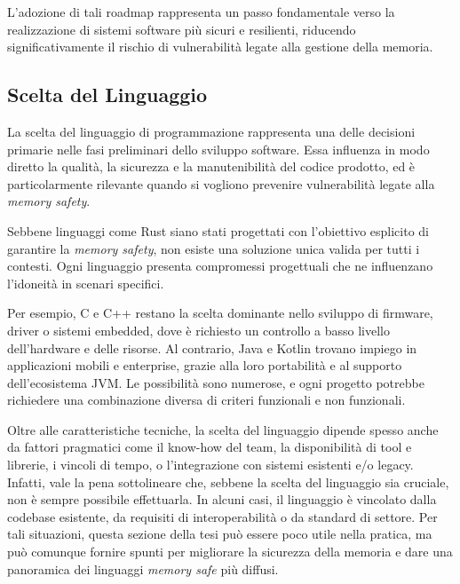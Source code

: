 L'adozione di tali roadmap rappresenta un passo fondamentale verso la realizzazione
di sistemi software più sicuri e resilienti, riducendo significativamente il
rischio di vulnerabilità legate alla gestione della memoria.

\subsection{Scelta del Linguaggio}
\label{sec:linguaggio}

La scelta del linguaggio di programmazione rappresenta una delle decisioni primarie
nelle fasi preliminari dello sviluppo software. Essa influenza in modo diretto
la qualità, la sicurezza e la manutenibilità del codice prodotto, ed è
particolarmente rilevante quando si vogliono prevenire vulnerabilità legate alla
\textit{memory safety}.

Sebbene linguaggi come Rust siano stati progettati con l'obiettivo esplicito di garantire
la \textit{memory safety}, non esiste una soluzione unica valida per tutti i contesti.
Ogni linguaggio presenta compromessi progettuali che ne influenzano l'idoneità
in scenari specifici.

Per esempio, C e C++ restano la scelta dominante nello sviluppo di firmware,
driver o sistemi embedded, dove è richiesto un controllo a basso livello dell'hardware
e delle risorse. Al contrario, Java e Kotlin trovano impiego in applicazioni mobili
e enterprise, grazie alla loro portabilità e al supporto dell'ecosistema JVM. Le
possibilità sono numerose, e ogni progetto potrebbe richiedere una combinazione
diversa di criteri funzionali e non funzionali.

Oltre alle caratteristiche tecniche, la scelta del linguaggio dipende spesso anche
da fattori pragmatici come il know-how del team, la disponibilità di tool e
librerie, i vincoli di tempo, o l'integrazione con sistemi esistenti e/o legacy.
Infatti, vale la pena sottolineare che, sebbene la scelta del linguaggio sia cruciale,
non è sempre possibile effettuarla. In alcuni casi, il linguaggio è vincolato
dalla codebase esistente, da requisiti di interoperabilità o da standard di settore.
Per tali situazioni, questa sezione della tesi può essere poco utile nella pratica,
ma può comunque fornire spunti per migliorare la sicurezza della memoria e dare
una panoramica dei linguaggi \textit{memory safe} più diffusi.

